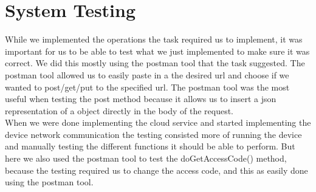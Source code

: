 \section{System Testing}
While we implemented the operations the task required us to implement, it was important for us to be able to test what we just implemented to make sure it was correct. We did this mostly using the postman tool that the task suggested. The postman tool allowed us to easily paste in a the desired url and choose if we wanted to post/get/put to the specified url. The postman tool was the most useful when testing the post method because it allows us to insert a json representation of a object directly in the body of the request.\\
When we were done implementing the cloud service and started implementing the device network communication the testing consisted more of running the device and manually testing the different functions it should be able to perform. But here we also used the postman tool to test the doGetAccessCode() method, because the testing required us to change the access code, and this as easily done using the postman tool.